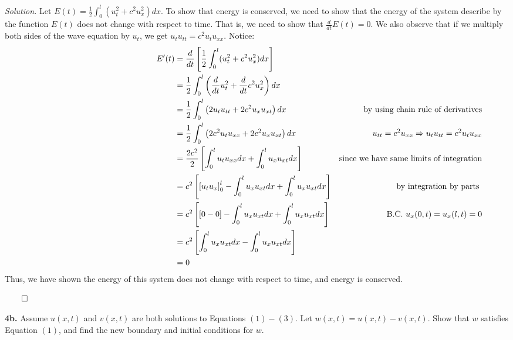 \documentclass{article}
\begin{document}
\vspace{3mm} 
\textit{Solution.} Let \(E(t) = \frac{1}{2} \int_{0}^l (u_t^2+c^2u_x^2 )dx\). To show that energy is conserved, we need to show that the energy of the system describe by the function \(E(t)\) does not change with respect to time. That is, we need to show that \(\frac{d}{dt} E(t)=0 \). We also observe that if we multiply both sides of the wave equation by \(u_t\), we get \(u_tu_{tt} = c^2u_tu_{xx}\). Notice: 
\begin{align*}
&& E'(t) &=  \frac{d}{dt} \left[ \frac{1}{2} \int_{0}^l (u_t^2+c^2u_x^2 )dx \right]   &   & \\
&& &=  \frac{1}{2} \int_{0}^l \left(\frac{d}{dt}u_t^2+\frac{d}{dt}c^2u_x^2 \right)dx  &   &\\
&& &= \frac{1}{2} \int_{0}^l \left( 2u_tu_{tt}+ 2c^2u_xu_{xt} \right) dx  &  \text{by using chain rule of derivatives} & \\
&& &= \frac{1}{2} \int_{0}^l \left( 2c^2u_tu_{xx}+ 2c^2u_xu_{xt} \right) dx  &  u_{tt} = c^2u_{xx} \Rightarrow u_tu_{tt} = c^2u_tu_{xx}& \\
 \hspace{50mm} && &= \frac{2c^2}{2}\left[ \int_{0}^l u_tu_{xx} dx +\int_{0}^l u_xu_{xt}  dx \right] & \text{since we have same limits of integration}&\\
&& &= c^2 \left[\left[u_tu_x \right]_0^l -\int_{0}^l u_xu_{xt} dx +\int_{0}^l u_xu_{xt}  dx \right] &  \text{by integration by parts }& \\
&& &= c^2 \left[\left[0- 0 \right] -\int_{0}^l u_xu_{xt} dx +\int_{0}^l u_xu_{xt}  dx \right] &  \text{B.C.  }u_x(0,t) = u_x(l,t) = 0 & \\
&& &= c^2 \left[\int_{0}^l u_xu_{xt} dx -\int_{0}^l u_xu_{xt}  dx \right] &  &  \\
&& &= 0  &  &  
\end{align*}
Thus, we have shown the energy of this system does not change with respect to time, and energy is conserved. 

\begin{flushright}
\( \qed \)
\end{flushright}

\newpage
\textbf{4b.} Assume \(u(x,t) \) and \(v(x,t)\) are both solutions to Equations \((1)-(3)\). Let \(w(x,t)=u(x,t)-v(x,t)\). Show that \(w\) satisfies Equation \((1)\), and find the new boundary and initial conditions for \(w\). 
\end{document}
